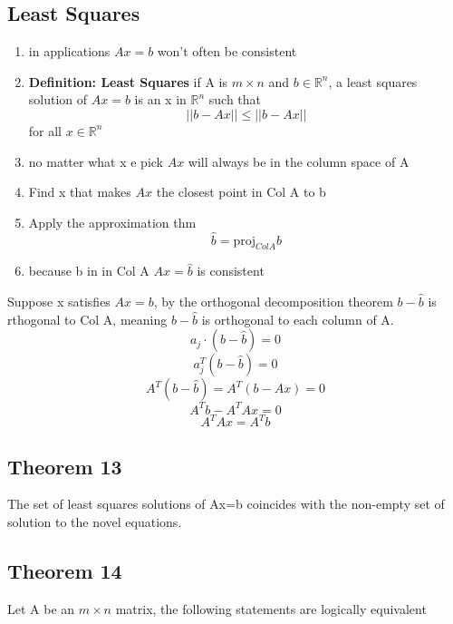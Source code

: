 \subsection{Least Squares}
\begin{enumerate}
	\item in applications $Ax=b$ won't often be consistent
	\item \textbf{Definition: Least Squares}
		if A is $m\times n$ and $b\in\mathbb{R}^{n}$, a least squares solution of $Ax=b$ is an x in $\mathbb{R}^{n}$ such that 
		\begin{equation}
			\label{}
		||b-Ax||\leq||b-Ax||	
		\end{equation}
	for all $x\in\mathbb{R}^{n}$
\item no matter what x e pick $Ax$ will always be in the column space of A
\item Find x that makes $Ax$ the closest point in Col A to b
\item Apply the approximation thm
	\begin{equation}
		\label{}
		\hat b = \mbox{proj}_{Col A}b
	\end{equation}
\item because b in in Col A $Ax=\hat b$ is consistent
\end{enumerate}
Suppose x satisfies $Ax=b$, by the orthogonal decomposition theorem $b-\hat b$ is rthogonal to Col A, meaning $b-\hat b$ is orthogonal to each column of A.
\begin{equation}
	\label{}
a_{j}\cdot (b-\hat b) = 0
\end{equation}
\begin{equation}
	\label{}
a_{j}^{T}(b-\hat b) = 0	
\end{equation}
\begin{equation}
	\label{}
	A^{T}(b-\hat b)=A^{T}(b-Ax)=0	
\end{equation}
\begin{equation}
	\label{}
A^{T}b-A^{T}Ax=0	
\end{equation}
\begin{equation}
	\label{}
A^{T}Ax=A^{T}b	
\end{equation}

\subsection{Theorem 13}
The set of least squares solutions of Ax=b coincides with the non-empty set of solution to the novel equations.

\subsection{Theorem 14}
Let A be an $m\times n$ matrix, the following statements are logically equivalent

